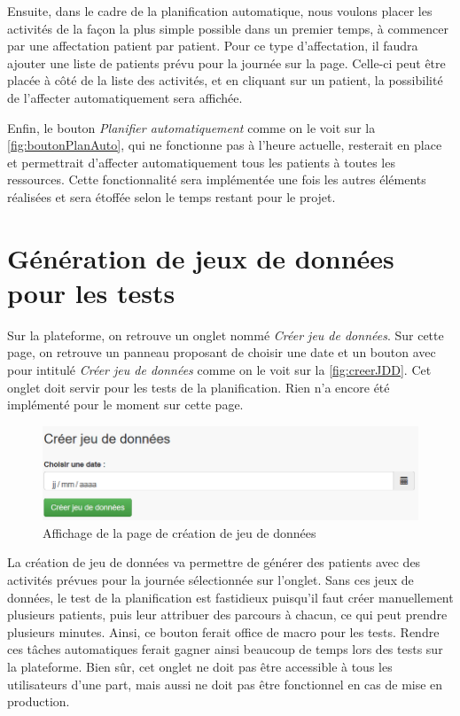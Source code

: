 \documentclass[noposter]{polytech/polytech}
\begin{document}
Ensuite, dans le cadre de la planification automatique, nous voulons placer les activités de la façon la plus simple possible dans un premier temps, à commencer par une affectation patient par patient. Pour ce type d'affectation, il faudra ajouter une liste de patients prévu pour la journée sur la page. Celle-ci peut être placée à côté de la liste des activités, et en cliquant sur un patient, la possibilité de l'affecter automatiquement sera affichée.

Enfin, le bouton \textit{Planifier automatiquement} comme on le voit sur la \autoref{fig:boutonPlanAuto}, qui ne fonctionne pas à l'heure actuelle, resterait en place et permettrait d'affecter automatiquement tous les patients à toutes les ressources. Cette fonctionnalité sera implémentée une fois les autres éléments réalisées et sera étoffée selon le temps restant pour le projet.


\section{Génération de jeux de données pour les tests}

Sur la plateforme, on retrouve un onglet nommé \textit{Créer jeu de données}. Sur cette page, on retrouve un panneau proposant de choisir une date et un bouton avec pour intitulé \textit{Créer jeu de données} comme on le voit sur la \autoref{fig:creerJDD}. Cet onglet doit servir pour les tests de la planification. Rien n'a encore été implémenté pour le moment sur cette page.

\begin{figure}
	\includegraphics[scale=0.75]{images/creerJDD}
	\caption{Affichage de la page de création de jeu de données}
	\label{fig:creerJDD}
\end{figure}

La création de jeu de données va permettre de générer des patients avec des activités prévues pour la journée sélectionnée sur l'onglet. Sans ces jeux de données, le test de la planification est fastidieux puisqu'il faut créer manuellement plusieurs patients, puis leur attribuer des parcours à chacun, ce qui peut prendre plusieurs minutes. Ainsi, ce bouton ferait office de macro pour les tests. Rendre ces tâches automatiques ferait gagner ainsi beaucoup de temps lors des tests sur la plateforme. Bien sûr, cet onglet ne doit pas être accessible à tous les utilisateurs d'une part, mais aussi ne doit pas être fonctionnel en cas de mise en production. 
\end{document}
